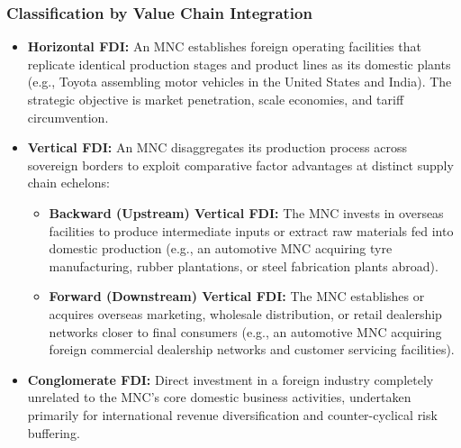 \subsubsection{Classification by Value Chain Integration}
\begin{itemize}[leftmargin=1.5em]
    \item \textbf{Horizontal FDI:} An MNC establishes foreign operating facilities that replicate identical production stages and product lines as its domestic plants (e.g., Toyota assembling motor vehicles in the United States and India). The strategic objective is market penetration, scale economies, and tariff circumvention.
    \item \textbf{Vertical FDI:} An MNC disaggregates its production process across sovereign borders to exploit comparative factor advantages at distinct supply chain echelons:
    \begin{itemize}[leftmargin=1.5em]
        \item \textbf{Backward (Upstream) Vertical FDI:} The MNC invests in overseas facilities to produce intermediate inputs or extract raw materials fed into domestic production (e.g., an automotive MNC acquiring tyre manufacturing, rubber plantations, or steel fabrication plants abroad).
        \item \textbf{Forward (Downstream) Vertical FDI:} The MNC establishes or acquires overseas marketing, wholesale distribution, or retail dealership networks closer to final consumers (e.g., an automotive MNC acquiring foreign commercial dealership networks and customer servicing facilities).
    \end{itemize}
    \item \textbf{Conglomerate FDI:} Direct investment in a foreign industry completely unrelated to the MNC's core domestic business activities, undertaken primarily for international revenue diversification and counter-cyclical risk buffering.
\end{itemize}

